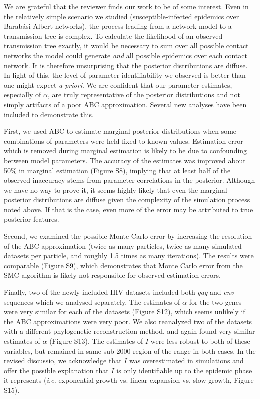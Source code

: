 \documentclass[12pt]{letter}
\begin{document}
\begin{letter}{ }
We are grateful that the reviewer finds our work to be of some interest. Even
in the relatively simple scenario we studied (susceptible-infected epidemics
over Barab\'asi-Albert networks), the process leading from a network model to a
transmission tree is complex. To calculate the likelihood of an observed
transmission tree exactly, it would be necessary to sum over all possible
contact networks the model could generate \emph{and} all possible epidemics
over each contact network. It is therefore unsurprising that the posterior
distributions are diffuse. In light of this, the level of parameter
identifiability we observed is better than one might expect \textit{a priori}.
We are confident that our parameter estimates, especially of $\alpha$, are
truly representative of the posterior distributions and not simply artifacts of
a poor ABC approximation. Several new analyses have been included to
demonstrate this.

First, we used ABC to estimate marginal posterior distributions when some
combinations of parameters were held fixed to known values. Estimation error
which is removed during marginal estimation is likely to be due to confounding
between model parameters. The accuracy of the estimates was improved about 50\%
in marginal estimation (Figure S8), implying that at least half of the observed
inaccuracy stems from parameter correlations in the posterior. Although we have
no way to prove it, it seems highly likely that even the marginal posterior
distributions are diffuse given the complexity of the simulation process noted
above. If that is the case, even more of the error may be attributed to true
posterior features.

Second, we examined the possible Monte Carlo error by increasing the resolution
of the ABC approximation (twice as many particles, twice as many simulated
datasets per particle, and roughly 1.5 times as many iterations). The results
were comparable (Figure S9), which demonstrates that Monte Carlo error from the
SMC algorithm is likely not responsible for observed estimation errors.

Finally, two of the newly included HIV datasets included both \textit{gag}
and \textit{env} sequences which we analysed separately. The estimates of
$\alpha$ for the two genes were very similar for each of the datasets (Figure
S12), which seems unlikely if the ABC approximations were very poor. We also
reanalyzed two of the datasets with a different phylogenetic reconstruction
method, and again found very similar estimates of $\alpha$ (Figure S13). The
estimates of $I$ were less robust to both of these variables, but remained in
same sub-2000 region of the range in both cases. In the revised discussio, we
acknowledge that $I$ was overestimated in simulations and offer the possible
explanation that $I$ is only identifiable up to the epidemic phase it
represents (\textit{i.e.} exponential growth vs. linear expansion vs. slow
growth, Figure S15).


\end{letter}
\end{document}
